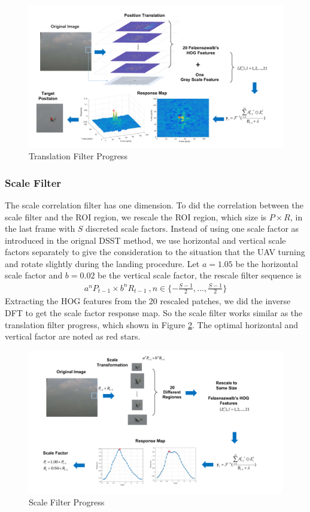 \documentclass[journal,article,submit,moreauthors,pdftex,10pt,a4paper]{mdpi}
\begin{document}
\begin{figure}[!t]
	\centering
	\includegraphics[width=\textwidth]{Figs/chp04_09_translation_map.pdf}	
	\caption{Translation Filter Progress}
	\label{fig:chp04_09_translation_map}
\end{figure}

\subsubsection{Scale Filter}
The scale correlation filter has one dimension. To did the correlation between the scale filter and the ROI region, we rescale the ROI region, which size is $P\times R$, in the last frame with $S$ discreted scale factors. Instead of using one scale factor as introduced in the orignal DSST method, we use horizontal and vertical scale factors separately to give the consideration to the situation that the UAV turning and rotate slightly during the landing procedure. Let $a=1.05$ be the horizontal scale factor and $b=0.02$ be the vertical scale factor, the rescale filter sequence is 
\begin{align}
a^nP_{t-1}\times b^nR_{t-1}\ ,n \in \{-\frac{S-1}{2},...,\frac{S-1}{2}\} 
\end{align}
Extracting the HOG features from the 20 rescaled patches, we did the inverse DFT to get the scale factor response map. So the scale filter works similar as the translation filter progress, which shown in Figure \ref{fig:chp04_10_scale_map}. The optimal horizontal and vertical factor are noted as red stars.
\begin{figure}[!t]
	\centering
	\includegraphics[width=\textwidth]{Figs/chp04_10_scale_map.pdf}	
	\caption{Scale Filter Progress}
	\label{fig:chp04_10_scale_map}
\end{figure}
\end{document}

